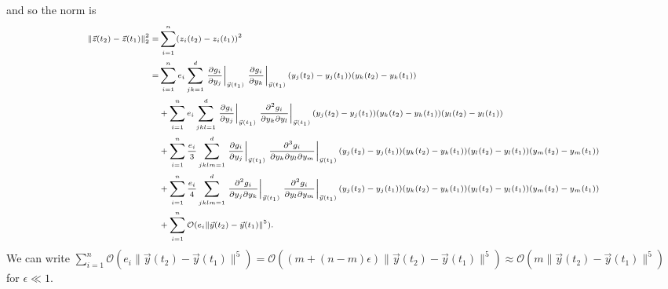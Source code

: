 \documentclass[12pt]{article}
\begin{document}
%
and so the norm is
%
\begin{equation} \label{eq:appendix_z_norm}
\scriptsize
\begin{aligned}
\|\vec{z}(t_2) - \vec{z}(t_1)\|_2^2 =& 
\sum_{i=1}^n (z_i(t_2) - z_i(t_1))^2 \\
=& \sum_{i=1}^n e_i \sum_{jk=1}^d \left. \frac{\partial g_i}{\partial y_j} \right|_{\vec{y}(t_1)} \left. \frac{\partial g_i}{\partial y_k} \right|_{\vec{y}(t_1)} (y_j(t_2)-y_j(t_1)) (y_k(t_2)-y_k(t_1)) \\
&+ \sum_{i=1}^n e_i \sum_{jkl=1}^d \left. \frac{\partial g_i}{\partial y_j} \right|_{\vec{y}(t_1)} \left. \frac{\partial^2 g_i}{\partial y_k \partial y_l} \right|_{\vec{y}(t_1)} (y_j(t_2)-y_j(t_1))  (y_k(t_2)-y_k(t_1)) (y_l(t_2)-y_l(t_1)) \\
&+ \sum_{i=1}^n \frac{e_i}{3} \sum_{jklm=1}^d \left. \frac{\partial g_i}{\partial y_j} \right|_{\vec{y}(t_1)} \left. \frac{\partial^3 g_i}{ \partial y_k \partial y_l \partial y_m} \right|_{\vec{y}(t_1)} (y_j(t_2)-y_j(t_1)) (y_k(t_2)-y_k(t_1)) (y_l(t_2)-y_l(t_1))(y_m(t_2)-y_m(t_1)) \\
&+ \sum_{i=1}^n \frac{e_i}{4} \sum_{jklm=1}^d \left. \frac{\partial^2 g_i}{\partial y_j \partial y_k} \right|_{\vec{y}(t_1)} \left. \frac{\partial^2 g_i}{\partial y_l \partial y_m} \right|_{\vec{y}(t_1)} (y_j(t_2)-y_j(t_1)) (y_k(t_2)-y_k(t_1)) (y_l(t_2)-y_l(t_1)) (y_m(t_2)-y_m(t_1)) \\
&+ \sum_{i=1}^n \mathcal{O}( e_i \|\vec{y}(t_2) - \vec{y}(t_1) \|^5) .
\end{aligned}
\end{equation}
%
We can write $\sum_{i=1}^n \mathcal{O}( e_i \|\vec{y}(t_2) - \vec{y}(t_1) \|^5) = \mathcal{O}( (m + (n-m) \epsilon) \|\vec{y}(t_2) - \vec{y}(t_1) \|^5) \approx \mathcal{O}( m \|\vec{y}(t_2) - \vec{y}(t_1) \|^5)$ for $\epsilon \ll 1$. 
\end{document}
